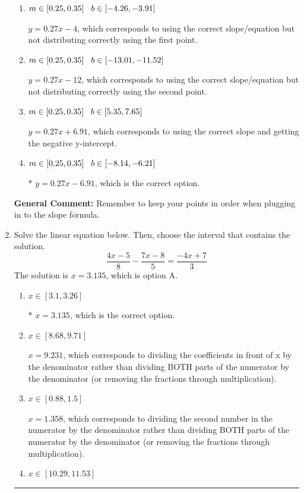 \documentclass{extbook}[14pt]
\newcommand{\litem}[1]{\item #1

\rule{\textwidth}{0.4pt}}
\begin{document}
\begin{enumerate}
{\begin{enumerate}[label=\Alph*.]
 $y = -0.27x -3.09$, which corresponds to using the negative slope and the correct equation.
\item \( m \in [0.25, 0.35] \hspace*{3mm} b \in [-4.26, -3.91] \)

 $y = 0.27x -4$, which corresponds to using the correct slope/equation but not distributing correctly using the first point.
\item \( m \in [0.25, 0.35] \hspace*{3mm} b \in [-13.01, -11.52] \)

 $y = 0.27x -12$, which corresponds to using the correct slope/equation but not distributing correctly using the second point.
\item \( m \in [0.25, 0.35] \hspace*{3mm} b \in [5.35, 7.65] \)

 $y = 0.27x + 6.91$, which corresponds to using the correct slope and getting the negative y-intercept.
\item \( m \in [0.25, 0.35] \hspace*{3mm} b \in [-8.14, -6.21] \)

* $y = 0.27x -6.91$, which is the correct option.
\end{enumerate}

\textbf{General Comment:} Remember to keep your points in order when plugging in to the slope formula.
}
\litem{
Solve the linear equation below. Then, choose the interval that contains the solution.
\[ \frac{4x -5}{8} - \frac{7x -8}{5} = \frac{-4x + 7}{3} \]The solution is \( x = 3.135 \), which is option A.\begin{enumerate}[label=\Alph*.]
\item \( x \in [3.1, 3.26] \)

* $x = 3.135$, which is the correct option.
\item \( x \in [8.68, 9.71] \)

 $x = 9.231$, which corresponds to dividing the coefficients in front of x by the denominator rather than dividing BOTH parts of the numerator by the denominator (or removing the fractions through multiplication).
\item \( x \in [0.88, 1.5] \)

 $x = 1.358$, which corresponds to dividing the second number in the numerator by the denominator rather than dividing BOTH parts of the numerator by the denominator (or removing the fractions through multiplication).
\item \( x \in [10.29, 11.53] \)


\end{enumerate}}
\end{enumerate}
\end{document}
